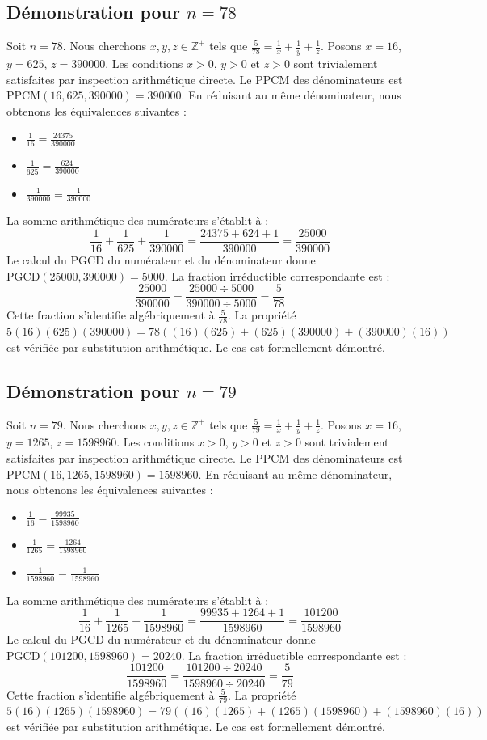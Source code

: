 \documentclass[12pt,a4paper]{article}
\begin{document}
\subsection{Démonstration pour $n = 78$}
Soit $n = 78$. Nous cherchons $x, y, z \in \mathbb{Z}^{+}$ tels que $\frac{5}{78} = \frac{1}{x} + \frac{1}{y} + \frac{1}{z}$.
Posons $x = 16$, $y = 625$, $z = 390000$.
Les conditions $x > 0$, $y > 0$ et $z > 0$ sont trivialement satisfaites par inspection arithmétique directe.
Le PPCM des dénominateurs est $\text{PPCM}(16, 625, 390000) = 390000$.
En réduisant au même dénominateur, nous obtenons les équivalences suivantes :
\begin{itemize}
    \item $\frac{1}{16} = \frac{24375}{390000}$
    \item $\frac{1}{625} = \frac{624}{390000}$
    \item $\frac{1}{390000} = \frac{1}{390000}$
\end{itemize}
La somme arithmétique des numérateurs s'établit à :
$$ \frac{1}{16} + \frac{1}{625} + \frac{1}{390000} = \frac{24375 + 624 + 1}{390000} = \frac{25000}{390000} $$
Le calcul du PGCD du numérateur et du dénominateur donne $\text{PGCD}(25000, 390000) = 5000$.
La fraction irréductible correspondante est :
$$ \frac{25000}{390000} = \frac{25000 \div 5000}{390000 \div 5000} = \frac{5}{78} $$
Cette fraction s'identifie algébriquement à $\frac{5}{78}$.
La propriété $5(16)(625)(390000) = 78((16)(625) + (625)(390000) + (390000)(16))$ est vérifiée par substitution arithmétique.
Le cas est formellement démontré.

\subsection{Démonstration pour $n = 79$}
Soit $n = 79$. Nous cherchons $x, y, z \in \mathbb{Z}^{+}$ tels que $\frac{5}{79} = \frac{1}{x} + \frac{1}{y} + \frac{1}{z}$.
Posons $x = 16$, $y = 1265$, $z = 1598960$.
Les conditions $x > 0$, $y > 0$ et $z > 0$ sont trivialement satisfaites par inspection arithmétique directe.
Le PPCM des dénominateurs est $\text{PPCM}(16, 1265, 1598960) = 1598960$.
En réduisant au même dénominateur, nous obtenons les équivalences suivantes :
\begin{itemize}
    \item $\frac{1}{16} = \frac{99935}{1598960}$
    \item $\frac{1}{1265} = \frac{1264}{1598960}$
    \item $\frac{1}{1598960} = \frac{1}{1598960}$
\end{itemize}
La somme arithmétique des numérateurs s'établit à :
$$ \frac{1}{16} + \frac{1}{1265} + \frac{1}{1598960} = \frac{99935 + 1264 + 1}{1598960} = \frac{101200}{1598960} $$
Le calcul du PGCD du numérateur et du dénominateur donne $\text{PGCD}(101200, 1598960) = 20240$.
La fraction irréductible correspondante est :
$$ \frac{101200}{1598960} = \frac{101200 \div 20240}{1598960 \div 20240} = \frac{5}{79} $$
Cette fraction s'identifie algébriquement à $\frac{5}{79}$.
La propriété $5(16)(1265)(1598960) = 79((16)(1265) + (1265)(1598960) + (1598960)(16))$ est vérifiée par substitution arithmétique.
Le cas est formellement démontré.
\end{document}
